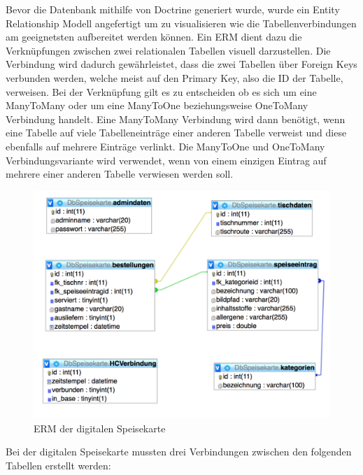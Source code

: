 Bevor die Datenbank mithilfe von Doctrine generiert wurde, wurde ein Entity Relationship Modell angefertigt um zu visualisieren wie die Tabellenverbindungen am geeignetsten aufbereitet werden können. Ein ERM dient dazu die Verknüpfungen zwischen zwei relationalen Tabellen visuell darzustellen. Die Verbindung wird dadurch gewährleistet, dass die zwei Tabellen über Foreign Keys verbunden werden, welche meist auf den Primary Key, also die ID der Tabelle, verweisen. Bei der Verknüpfung gilt es zu entscheiden ob es sich um eine ManyToMany oder um eine ManyToOne beziehungsweise OneToMany Verbindung handelt. Eine ManyToMany Verbindung wird dann benötigt, wenn eine Tabelle auf viele Tabelleneinträge einer anderen Tabelle verweist und diese ebenfalls auf mehrere Einträge verlinkt. Die ManyToOne und OneToMany Verbindungsvariante wird verwendet, wenn von einem einzigen Eintrag auf mehrere einer anderen Tabelle verwiesen werden soll.
			\begin{figure}[H]
			\begin{centering}
			\includegraphics[width = 1\textwidth]{Bilder/Jok_ERM}
			\par\end{centering}
			\caption{ERM der digitalen Speisekarte}
			\label{ERM der digitalen Speisekarte}
			\end{figure}Bei der digitalen Speisekarte mussten drei Verbindungen zwischen den folgenden Tabellen erstellt werden:
